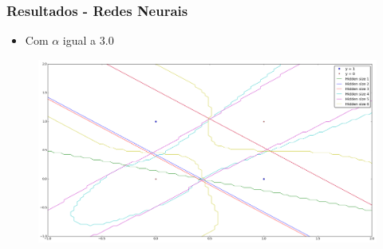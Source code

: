 \documentclass[10pt]{beamer}
\begin{document}
\begin{frame}
  \frametitle{Resultados - Redes Neurais}

  \begin{itemize}
  \item Com $\alpha$ igual a 3.0
 \end{itemize}

  \begin{adjustwidth}{-3em}{-3em}
  \begin{figure}[htb]
    \begin{center}
        \includegraphics[scale=0.18]{img/boundaries_rnns_new.png}
    \end{center}
  \end{figure}
  \end{adjustwidth}
\end{frame}
\end{document}
